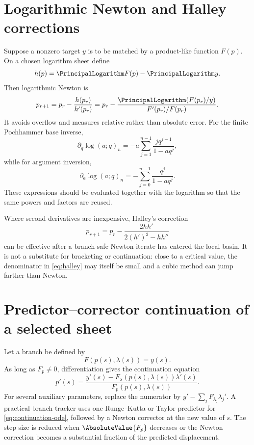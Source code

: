 \documentclass[11pt,letterpaper,oneside,openany]{book}
\theoremstyle{definition}
\theoremstyle{remark}
\begin{document}
\section{Logarithmic Newton and Halley corrections}
Suppose a nonzero target \(y\) is to be matched by a product-like function
\(F(p)\).  On a chosen logarithm sheet define
\[
 h(p)=\PrincipalLogarithm F(p)-\PrincipalLogarithm y.
\]
Then logarithmic Newton is
\begin{equation}\label{eq:log-newton}
 p_{r+1}=p_r-\frac{h(p_r)}{h'(p_r)}
 =p_r-\frac{\PrincipalLogarithm(F(p_r)/y)}{F'(p_r)/F(p_r)}.
\end{equation}
It avoids overflow and measures relative rather than absolute error.  For the
finite Pochhammer base inverse,
\begin{equation}\label{eq:finite-qpoch-log-derivative-q}
 \partial_q\log(a;q)_n
 =-a\sum_{j=1}^{n-1}\frac{j q^{j-1}}{1-aq^j},
\end{equation}
while for argument inversion,
\begin{equation}\label{eq:finite-qpoch-log-derivative-a}
 \partial_a\log(a;q)_n
 =-\sum_{j=0}^{n-1}\frac{q^j}{1-aq^j}.
\end{equation}
These expressions should be evaluated together with the logarithm so that the
same powers and factors are reused.

Where second derivatives are inexpensive, Halley's correction
\begin{equation}\label{eq:halley}
 p_{r+1}=p_r-
 \frac{2h h'}{2(h')^2-hh''}
\end{equation}
can be effective after a branch-safe Newton iterate has entered the local
basin.  It is not a substitute for bracketing or continuation: close to a
critical value, the denominator in \eqref{eq:halley} may itself be small and a
cubic method can jump farther than Newton.

\section{Predictor--corrector continuation of a selected sheet}
Let a branch be defined by
\[
 F(p(s),\lambda(s))=y(s).
\]
As long as \(F_p\ne0\), differentiation gives the continuation equation
\begin{equation}\label{eq:continuation-ode}
 p'(s)=\frac{y'(s)-F_\lambda(p(s),\lambda(s))\lambda'(s)}
 {F_p(p(s),\lambda(s))}.
\end{equation}
For several auxiliary parameters, replace the numerator by
\(y'-\sum_jF_{\lambda_j}\lambda_j'\).  A practical branch tracker uses one
Runge--Kutta or Taylor predictor for \eqref{eq:continuation-ode}, followed by a
Newton corrector at the new value of \(s\).  The step size is reduced when
\(\AbsoluteValue{F_p}\) decreases or the Newton correction becomes a substantial
fraction of the predicted displacement.
\end{document}
